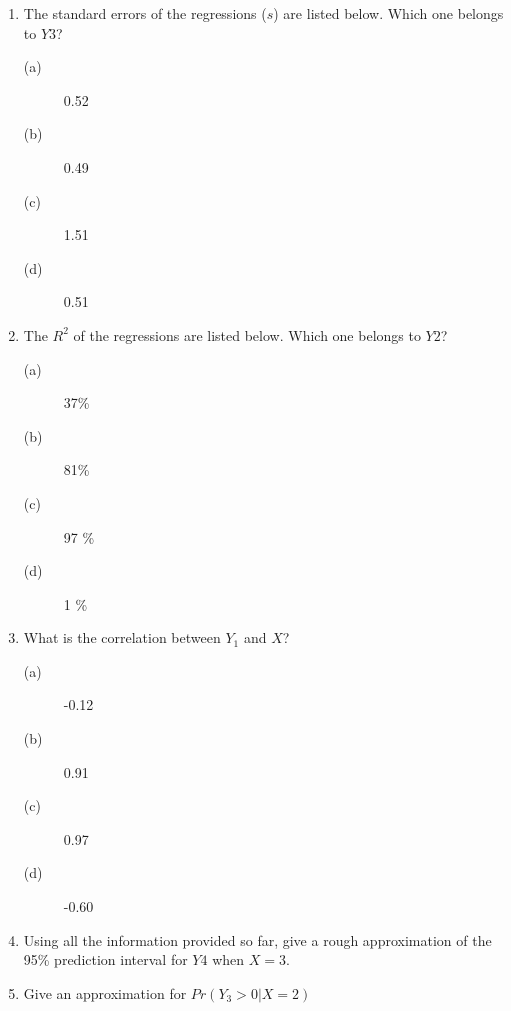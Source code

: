 \documentclass[12pt]{article}
\begin{document}
\begin{enumerate}
\item The standard errors of the regressions  ($s$) are listed below. Which one belongs to $Y3$?
\begin{description}
\item[(a)]0.52
\item[(b)]0.49
\item[(c)]1.51 
\item[(d)]0.51
\end{description}

\vspace{1cm}

 \item The $R^2$ of the regressions are listed below. Which one belongs to $Y2$?
\begin{description}
\item[(a)] 37\%
\item[(b)] 81\%
\item[(c)] 97 \%
\item[(d)] 1 \%
\end{description}

\newpage

\vspace{1cm}

\item What is the correlation between $Y_1$ and $X$?
\begin{description}
\item[(a)]-0.12
\item[(b)] 0.91
\item[(c)] 0.97
\item[(d)]-0.60
\end{description}


\item Using all the information provided so far, give a rough approximation of the 95\% prediction interval for $Y4$ when $X = 3$.

\vspace{3cm}


\item Give an approximation for $Pr(Y_3 > 0 | X = 2)$


\end{enumerate}
\end{document}
